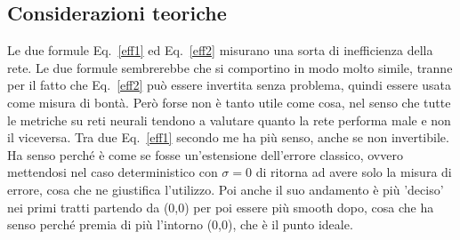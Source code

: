 \documentclass[
	letterpaper,
	a4paper,
	cleardoublepage=empty,
	headings=twolinechapter,
	numbers=autoenddot,
]{article}
\newcommand{\Eq}[0]{Eq.}
\begin{document}
	\subsection{Considerazioni teoriche}
	Le due formule \Eq~\ref{eff1} ed \Eq~\ref{eff2} misurano una sorta di inefficienza della rete. Le due formule sembrerebbe che si comportino in modo molto simile, tranne per il fatto che \Eq~\ref{eff2} può essere invertita senza problema, quindi essere usata come misura di bontà. Però forse non è tanto utile come cosa, nel senso che tutte le metriche su reti neurali tendono a valutare quanto la rete performa male e non il viceversa. Tra due \Eq~\ref{eff1} secondo me ha più senso, anche se non invertibile. Ha senso perché è come se fosse un'estensione dell'errore classico, ovvero mettendosi nel caso deterministico con $\sigma=0$ di ritorna ad avere solo la misura di errore, cosa che ne giustifica l'utilizzo. Poi anche il suo andamento è più 'deciso' nei primi tratti partendo da (0,0) per poi essere più smooth dopo, cosa che ha senso perché premia di più l'intorno (0,0), che è il punto ideale.
	
	
	\clearpage
	
	
	
	
	
	
\end{document}
